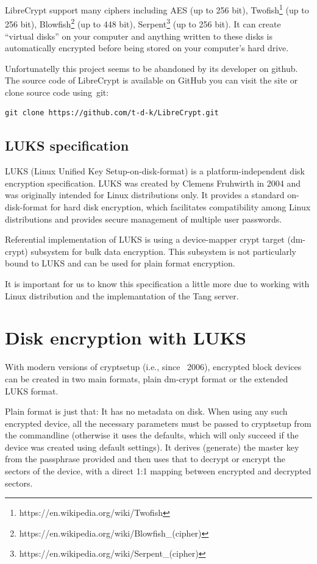 LibreCrypt support many ciphers including AES (up to 256 bit), Twofish\footnote{https://en.wikipedia.org/wiki/Twofish} (up to 256 bit), Blowfish\footnote{https://en.wikipedia.org/wiki/Blowfish\_(cipher)} (up to 448 bit), Serpent\footnote{https://en.wikipedia.org/wiki/Serpent\_(cipher)} (up to 256 bit)\cite{librecrypt}.
It can create “virtual disks” on your computer and anything written to these disks is automatically encrypted before being stored on your computer’s hard drive\cite{FreeOTFE}.

Unfortunatelly this project seems to be abandoned by its developer on github.
The source code of LibreCrypt is available on GitHub you can visit the site or clone source code using~git:
\begin{lstlisting}[columns=fixed,tabsize=4,backgroundcolor=\color{yellow!10}]
git clone https://github.com/t-d-k/LibreCrypt.git
\end{lstlisting}

\subsection{LUKS specification}

LUKS (Linux Unified Key Setup-on-disk-format) is a platform-independent disk encryption specification.
LUKS was created by Clemens Fruhwirth in 2004 and was originally intended for Linux distributions only.
It provides a standard on-disk-format for hard disk encryption, which facilitates compatibility among Linux distributions and provides secure management of multiple user passwords.

Referential implementation of LUKS is using a device-mapper crypt target (dm-crypt) subsystem for bulk data encryption.
This subsystem is not particularly bound to LUKS and can be used for plain format encryption.

It is important for us to know this specification a little more due to working with Linux distribution and the implemantation of the Tang server.

\section{Disk encryption with LUKS}

With modern versions of cryptsetup (i.e., since ~2006), encrypted block devices can be created in two main formats, plain dm-crypt format or the extended LUKS format.

Plain format is just that: It has no metadata on disk.
When using any such encrypted device, all the necessary parameters must be passed to cryptsetup from the commandline (otherwise it uses the defaults, which will only succeed if the device was created using default settings).
It derives (generate) the master key from the passphrase provided and then uses that to decrypt or encrypt the sectors of the device, with a direct 1:1 mapping between encrypted and decrypted sectors.

